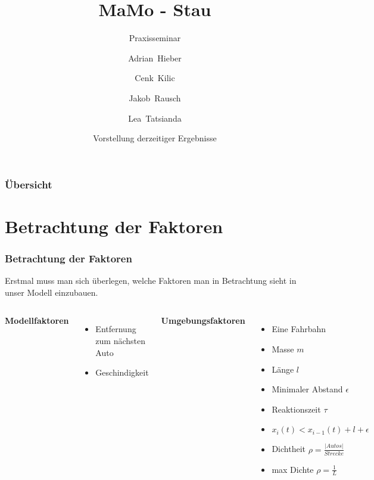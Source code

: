 \documentclass{beamer}
\title[MaMo - Stau] %
{MaMo - Stau}
\subtitle{Praxisseminar}
\author[Hieber, Kilic, Rausch, Tatsianda] %
{Adrian~Hieber \and Cenk~Kilic \and Jakob~Rausch \and Lea~Tatsianda}
\date[\today] %
{Vorstellung derzeitiger Ergebnisse}
\begin{document}
\frame{\titlepage}


\begin{frame}
\frametitle{Übersicht}
\tableofcontents
\end{frame}


\section{Betrachtung der Faktoren}

\begin{frame}
\frametitle{Betrachtung der Faktoren}
Erstmal muss man sich überlegen, welche Faktoren man in Betrachtung sieht in unser Modell einzubauen. 
\newline

\begin{columns}

\textbf{Modellfaktoren}
\begin{itemize}
    \item<2-> Entfernung zum nächsten Auto
    \item<2-> Geschindigkeit
\end{itemize}

\textbf{Umgebungsfaktoren}
\begin{itemize}
	\item<3-> Eine Fahrbahn
    \item<3-> Masse $m$
    \item<3-> Länge $l$
    \item<3-> Minimaler Abstand $\epsilon$
    \item<3-> Reaktionszeit $\tau$
    \item<3-> $x_{i}(t) < x_{i-1}(t)+l+\epsilon$
    \item<3-> Dichtheit $\rho=\frac{|Autos|}{Strecke}$
   	\item<3-> max Dichte $\rho=\frac{1}{L}$
\end{itemize}

\end{columns}
\end{frame}

\end{document}
